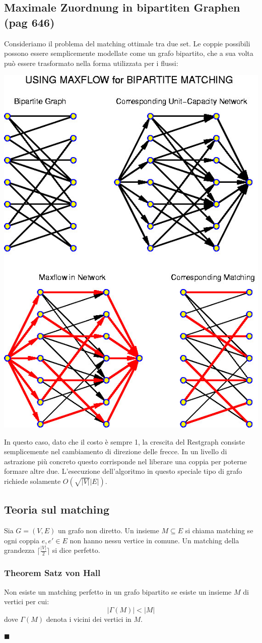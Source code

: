 \documentclass[a4paper]{book}
\newenvironment{mytheorem}[1]{\subsubsection*{Theorem #1}}{\begin{flushright}$\blacksquare$\end{flushright}}
\begin{document}
\subsection{Maximale Zuordnung in bipartiten Graphen (pag 646)}
Consideriamo il problema del matching ottimale tra due set. Le coppie possibili possono essere semplicemente modellate come un grafo bipartito, che a sua volta può essere trasformato nella forma utilizzata per i flussi:
\begin{center}
\includegraphics[scale=0.5]{Figures/matching.jpg}
\end{center}
In questo caso, dato che il costo è sempre 1, la crescita del Restgraph consiste semplicemente nel cambiamento di direzione delle frecce. In un livello di astrazione più concreto questo corrisponde nel liberare una coppia per poterne formare altre due. L'esecuzione dell'algoritmo in questo speciale tipo di grafo richiede solamente $O(\sqrt{|V|}|E|)$.
\subsection{Teoria sul matching}
Sia $G=(V,E)$ un grafo non diretto. Un insieme $M\subseteq E$ si chiama matching se ogni coppia $e,e' \in E$ non hanno nessu vertice in comune. Un matching della grandezza $\lceil \frac{|V|}{2} \rceil$ si dice perfetto.
\begin{mytheorem}{Satz von Hall}
Non esiste un matching perfetto in un grafo bipartito se esiste un insieme $M$ di vertici per cui:
$$|\Gamma (M)|<|M|$$
dove $\Gamma (M)$ denota i vicini dei vertici in $M$.
\end{mytheorem}
\end{document}
